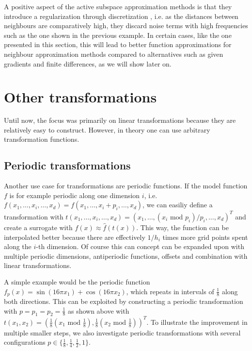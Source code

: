 \documentclass[
  a4paper,  %
  twoside,  %
  bibliography=totoc,
  headsepline,
  cleardoublepage=empty,
  parskip=half,
  draft=false
]{scrbook}
\begin{document}
A positive aspect of the active subspace approximation methods is that they introduce a regularization through discretization \cite{}, i.e. as the distances between neighbours are comparatively high, they discard noise terms with high frequencies such as the one shown in the previous example.
In certain cases, like the one presented in this section, this will lead to better function approximations for neighbour approximation methods compared to alternatives such as given gradients and finite differences, as we will show later on.


\section{Other transformations}

Until now, the focus was primarily on linear transformations because they are relatively easy to construct.
However, in theory one can use arbitrary transformation functions.

\subsection{Periodic transformations}

Another use case for transformations are periodic functions.
If the model function $f$ is for example periodic along one dimension $i$, i.e. $f(x_1,\dots,x_i,\dots,x_d)=f(x_1,\dots,x_i + p_i, \dots,x_d)$, we can easiliy define a transformation with $t(x_1,\dots,x_i,\dots,x_d)=(x_1,\dots,(x_i\text{ mod } p_i) /p_i, \dots,x_d)^T$ and create a surrogate with $f(x) \approx \hat{f}(t(x))$.
This way, the function can be interpolated better because there are effectively $1 / h_i$ times more grid points spent along the $i$-th dimension.
Of course this can concept can be expanded upon with multiple periodic dimensions, antiperiodic functions, offsets and combination with linear transformations.

A simple example would be the periodic function $f_p(x)=\sin(16\pi x_1)  + \cos(16\pi x_2)$, which repeats in intervals of $\frac{1}{8}$ along both directions.
This can be exploited by constructing a periodic transformation with $p=p_1=p_2=\frac{1}{8}$ as shown above with $t(x_1,x_2)=(\frac{1}{8} (x_1 \text{ mod } \frac{1}{8}), \frac{1}{8} (x_2 \text{ mod } \frac{1}{8}))^T$.
To illustrate the improvement in multiple smaller steps, we also investigate periodic transformations with several configurations $p \in \{\frac{1}{8}, \frac{1}{4}, \frac{1}{2}, 1\}$.
\end{document}
